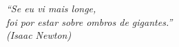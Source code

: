 \begin{epigrafe}
    \vspace*{\fill}
	\begin{flushright}
		\textit{``Se eu vi mais longe,\\
foi por estar sobre ombros de gigantes.''\\
        (Isaac Newton)}
	\end{flushright}
\end{epigrafe}